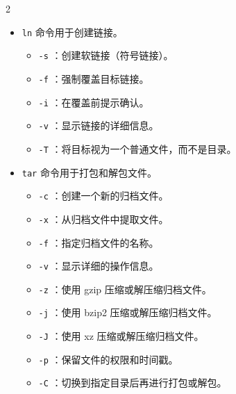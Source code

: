 \begin{multicols}{2}
\begin{itemize}
\begin{itemize}
                \item  \texttt{-v} ：显示移动的详细信息。
                \item  \texttt{-u} ：只在源文件比目标文件新时才进行移动。
            \end{itemize}
        \item  \texttt{ln} 命令用于创建链接。
            \begin{itemize}
                \item  \texttt{-s} ：创建软链接（符号链接）。
                \item  \texttt{-f} ：强制覆盖目标链接。
                \item  \texttt{-i} ：在覆盖前提示确认。
                \item  \texttt{-v} ：显示链接的详细信息。
                \item  \texttt{-T} ：将目标视为一个普通文件，而不是目录。
            \end{itemize}
        \item  \texttt{tar} 命令用于打包和解包文件。
            \begin{itemize}
                \item  \texttt{-c} ：创建一个新的归档文件。
                \item  \texttt{-x} ：从归档文件中提取文件。
                \item  \texttt{-f} ：指定归档文件的名称。
                \item  \texttt{-v} ：显示详细的操作信息。
                \item  \texttt{-z} ：使用 gzip 压缩或解压缩归档文件。
                \item  \texttt{-j} ：使用 bzip2 压缩或解压缩归档文件。
                \item  \texttt{-J} ：使用 xz 压缩或解压缩归档文件。
                \item  \texttt{-p} ：保留文件的权限和时间戳。
                \item  \texttt{-C} ：切换到指定目录后再进行打包或解包。
            \end{itemize}
    \end{itemize}

\end{multicols}
